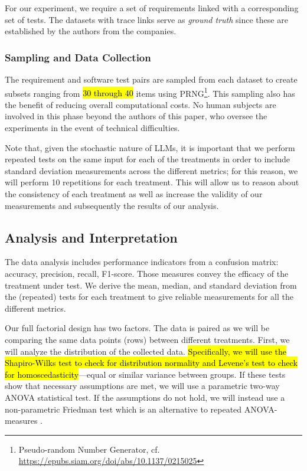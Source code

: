 \documentclass[conference]{IEEEtran}
\newcommand{\hly}[1]{\sethlcolor{yellow}\hl{#1}}
\begin{document}
For our experiment, we require a set of requirements linked with a corresponding set of tests. The datasets with trace links serve as \textit{ground truth} since these are established by the authors from the companies.


\subsubsection{Sampling and Data Collection}
The requirement and software test pairs are sampled from each dataset to create subsets ranging from \hly{30 through 40} items using PRNG\footnote{Pseudo-random Number Generator, cf. \url{https://epubs.siam.org/doi/abs/10.1137/0215025}}. This sampling also has the benefit of reducing overall computational costs. No human subjects are involved in this phase beyond the authors of this paper, who oversee the experiments in the event of technical difficulties.

Note that, given the stochastic nature of LLMs, it is important that we perform repeated tests on the same input for each of the treatments in order to include standard deviation measurements across the different metrics; for this reason, we will perform 10 repetitions for each treatment. This will allow us to reason about the consistency of each treatment as well as increase the validity of our measurements and subsequently the results of our analysis.


\subsection{Analysis and Interpretation}\label{sec:analysis}

The data analysis includes performance indicators from a confusion matrix: accuracy, precision, recall, F1-score. Those measures convey the efficacy of the treatment under test. We derive the mean, median, and standard deviation from the (repeated) tests for each treatment to give reliable measurements for all the different metrics. 

Our full factorial design has two factors. The data is paired as we will be comparing the same data points (rows) between different treatments. First, we will analyze the distribution of the collected data. \hly{Specifically, we will use the Shapiro-Wilks test to check for distribution normality and Levene's test to check for homoscedasticity}---equal or similar variance between groups. If these tests show that necessary assumptions are met, we will use a parametric two-way ANOVA statistical test. If the assumptions do not hold, we will instead use a non-parametric Friedman test which is an alternative to repeated ANOVA-measures \cite{mccrum2008statisticalTests}.
\end{document}
